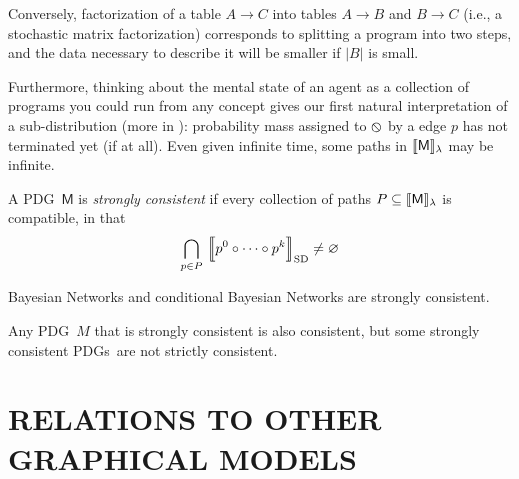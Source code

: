 \documentclass{article}
\newcommand\SD{_{\text{SD}}}
\newcommand{\none}{\varobslash}
\newcommand{\sfM}{\mathsf M}
\newcommand{\MN}{PDG}
\newcommand{\MNs}{\MN s}
\numberwithin{equation}{section}
\begin{document}
\begin{vfull}
\begin{example}
		Conversely, factorization of a table $A \to C$ into tables $A \to B$ and $B \to C$ (i.e., a stochastic matrix factorization) corresponds to splitting a program into two steps, and the data necessary to describe it will be smaller if $|B|$ is small.
	\end{example}	
	
	
	Furthermore, thinking about the mental state of an agent as a collection of programs you could run from any concept gives our first natural interpretation of a sub-distribution (more in ): probability mass assigned to $\none$ by a edge $p$ has not terminated yet (if at all). 
	Even given infinite time, some paths in $\bbr{\sfM}_\lambda$ may be infinite.
	
	\begin{defn}
		A \MN\ $\sfM$ is \emph{strongly consistent} if every collection of paths $P \subseteq \bbr{\sfM}_\lambda$ is compatible, in that 
		$$\bigcap_{p \in P}\ \bbr*{\vphantom{\Big|}p^0\circ \cdots\circ p^k}\SD \neq \varnothing$$
	\end{defn}

	\begin{example}
		Bayesian Networks and conditional Bayesian Networks are strongly consistent.
	\end{example}

	\begin{prop}
		Any \MN\ $M$ that is strongly consistent is also consistent, but some strongly consistent \MNs\ are not strictly consistent.
	\end{prop}




	\end{vfull}



	\section{RELATIONS TO OTHER GRAPHICAL MODELS}\label{sec:other-graphical-models}
	
\end{document}
